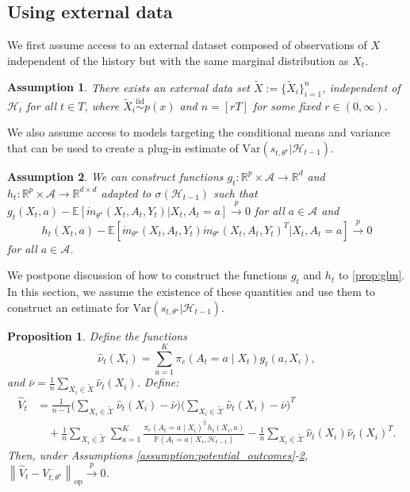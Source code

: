 \documentclass[11pt]{article}
\newcommand{\Hist}{\mathcal{H}}
\newcommand{\E}{\mathbb{E}}
\newcommand{\Var}{\mathrm{Var}}
\newcommand{\norm}[1]{\left\lVert#1\right\rVert}
\newtheorem{proposition}{Proposition}
\newtheorem{assumption}{Assumption}
\begin{document}
\subsection{Using external data} \label{subsec:external}
We first assume access to an external dataset composed of observations of $X$ independent of the history but with the same marginal distribution as $X_{t}$. 

\begin{assumption} \label{assumption:external}
There exists an external data set $\tilde{X} := \{ \tilde{X}_{i}\}_{i=1}^{n}$, independent of $\mathcal{H}_{t}$ for all $t \in T$, where $\tilde{X}_{i} \overset{\mathrm{iid}}{\sim} p(x)$ and $n = [rT]$ for some fixed $r \in (0,\infty)$. 
\end{assumption}

We also assume access to models targeting the conditional means and variance that can be used to create a plug-in estimate of $\Var \left(s_{t,\theta^{\star}} |\Hist_{t-1} \right)$.

\begin{assumption} \label{assumption:converges_var} We can construct functions $g_{t} : \mathbb{R}^{p} \times \mathcal{A} \to \mathbb{R}^{d}$ and $h_{t} : \mathbb{R}^{p}\times \mathcal{A}  \to \mathbb{R}^{d \times d}$ adapted to $\sigma(\mathcal{H}_{t-1})$ such that 
$g_{t}(X_{t},a) - \E\left[\dot{m}_{\theta^{\star}}(X_t,A_t,Y_t) |X_{t},A_t=a \right]\overset{p}{\to} 0$ for all $a \in \mathcal{A}$ and $$h_{t}(X_{t},a) - \E \left[  \dot{m}_{\theta^{\star}}(X_t,A_t,Y_{t} )\dot{m}_{\theta^{\star}}(X_t,A_t,Y_{t} )^{T} | X_{t},A_t=a \right] \overset{p}{\to} 0$$ for all $a \in \mathcal{A}$. 
\end{assumption}
We postpone discussion of how to construct the functions $g_t$ and $h_t$ to \cref{prop:glm}. In this section, we assume the existence of these quantities and use them to construct an estimate for $\Var \left(s_{t,\theta^{\star}} |\Hist_{t-1} \right)$. 
\begin{proposition} \label{prop:estimator}
Define the functions
\begin{equation} \label{equation:nu_t}
  \hat{\nu}_{t}(X_i) = \sum_{a=1}^{K} \pi_{e}(A_{t} = a \mid X_{t}) g_{t}(a,X_i),
\end{equation}
and $\bar{\nu} = \frac{1}{n} \sum_{X_{i} \in \tilde{X}} \hat{\nu}_{t}(X_i)$. Define: 
\begin{align*}
\hat{V}_{t} &= \frac{1}{n - 1} 
\Biggl( \sum_{X_i \in \mathcal{\tilde{X}}} \hat{\nu}_t(X_i)
- \bar{\nu} \Biggr)
\Biggl( \sum_{X_i \in \mathcal{\tilde{X}}} \hat{\nu}_t(X_i) 
- \bar{\nu} \Biggr)^{T} \\
&\quad + \frac{1}{n} \sum_{X_i \in \mathcal{\tilde{X}}} \sum_{a=1}^{K} 
\frac{\pi_e(A_t = a \mid X_i)^2 \, h_t(X_i,a)}{\mathbb{P}(A_t = a \mid X_i, \mathcal{H}_{t-1})} 
- \frac{1}{n} \sum_{X_i \in \mathcal{\tilde{X}}}  \hat{\nu}_{t}(X_i)\hat{\nu}_{t}(X_i)^{T}.
\end{align*}
Then, under Assumptions \ref{assumption:potential_outcomes}-\ref{assumption:converges_var}, 
$\norm{\hat{V}_{t} - V_{t,\theta^{\star}}}_{\text{op}} \overset{p}{\to} 0$.
\end{proposition}
\end{document}
